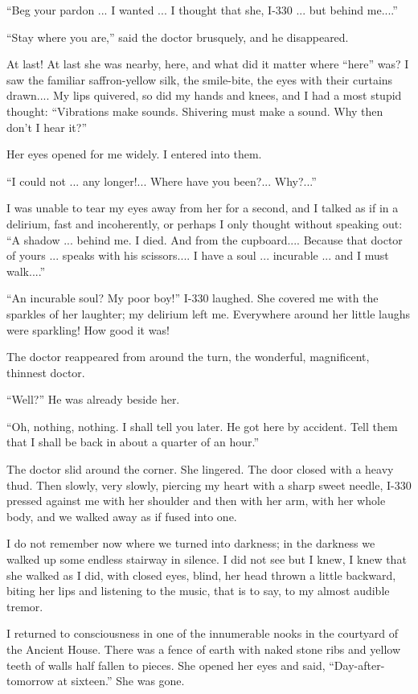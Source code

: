 \documentclass[11pt,openany]{book}
\begin{document}
``Beg your pardon ... I wanted ... I thought that she, I-330 ... but behind me....''

``Stay where you are,'' said the doctor brusquely, and he disappeared.

At last! At last she was nearby, here, and what did it matter where ``here'' was? I saw the familiar saffron-yellow silk, the smile-bite, the eyes with their curtains drawn.... My lips quivered, so did my hands and knees, and I had a most stupid thought: ``Vibrations make sounds. Shivering must make a sound. Why then don't I hear it?''

Her eyes opened for me widely. I entered into them.

``I could not ... any longer!... Where have you been?... Why?...''

I was unable to tear my eyes away from her for a second, and I talked as if in a delirium, fast and incoherently, or perhaps I only thought without speaking out: ``A shadow ... behind me. I died. And from the cupboard.... Because that doctor of yours ... speaks with his scissors.... I have a soul ... incurable ... and I must walk....''

``An incurable soul? My poor boy!'' I-330 laughed. She covered me with the sparkles of her laughter; my delirium left me. Everywhere around her little laughs were sparkling! How good it was!

The doctor reappeared from around the turn, the wonderful, magnificent, thinnest doctor.

``Well?'' He was already beside her.

``Oh, nothing, nothing. I shall tell you later. He got here by accident. Tell them that I shall be back in about a quarter of an hour.''

The doctor slid around the corner. She lingered. The door closed with a heavy thud. Then slowly, very slowly, piercing my heart with a sharp sweet needle, I-330 pressed against me with her shoulder and then with her arm, with her whole body, and we walked away as if fused into one.

I do not remember now where we turned into darkness; in the darkness we walked up some endless stairway in silence. I did not see but I knew, I knew that she walked as I did, with closed eyes, blind, her head thrown a little backward, biting her lips and listening to the music, that is to say, to my almost audible tremor.

I returned to consciousness in one of the innumerable nooks in the courtyard of the Ancient House. There was a fence of earth with naked stone ribs and yellow teeth of walls half fallen to pieces. She opened her eyes and said, ``Day-after-tomorrow at sixteen.'' She was gone.
\end{document}
